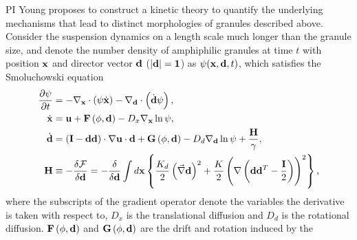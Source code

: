 %
PI Young proposes to construct a kinetic theory to quantify the underlying mechanisms that lead to distinct morphologies of granules described above.
Consider the suspension dynamics on a length scale much longer than the granule size, and denote the number density of 
amphiphilic granules at time $t$ with position ${\bf x}$ and director vector ${\bf d}$ ($|\bf d|=1$) as $\psi({\bf x}, {\bf d},t)$, which satisfies the 
Smoluchowski equation 
\begin{align}
\frac{\partial \psi}{\partial t} &= -\nabla_{\bf x} \cdot\left(\psi\dot{\bf x}\right) - \nabla_{\bf d}\cdot\left(\dot{\bf d}\psi\right),\\
\dot{\bf x} &= {\bf u} + {\bf F}\left(\phi,{\bf d}\right) - D_x\nabla_{\bf x}\ln\psi,\\
\label{eq:dpdt}
\dot{\bf d} &= \left({\bf I}-{\bf d}{\bf d}\right)\cdot\nabla {\bf u}\cdot {\bf d} + {\bf G}\left(\phi,{\bf d}\right) - D_d \nabla_{\bf d}\ln \psi + \frac{{\bf H}}{\gamma},\\
{\bf H} &\equiv -\frac{\delta {\cal F}}{\delta {\bf d}} = -\frac{\delta}{\delta {\bf d}} 
\int d{\bf x} \left\{\frac{K_d}{2} \left(\vec\nabla{\bf d}\right)^2 + \frac{K}{2}\left(\nabla\left({\bf d}{\bf d}^T- \frac{\bf I}{2}\right)\right)^2\right\},
\end{align}
where the subscripts of the gradient operator denote the variables the derivative is taken with
respect to, $D_x$ is the translational diffusion and $D_d$ is the
rotational diffusion. ${\bf F}\left(\phi,{\bf d}\right)$ and ${\bf
G}\left(\phi,{\bf d}\right)$ are the drift and rotation induced by the
